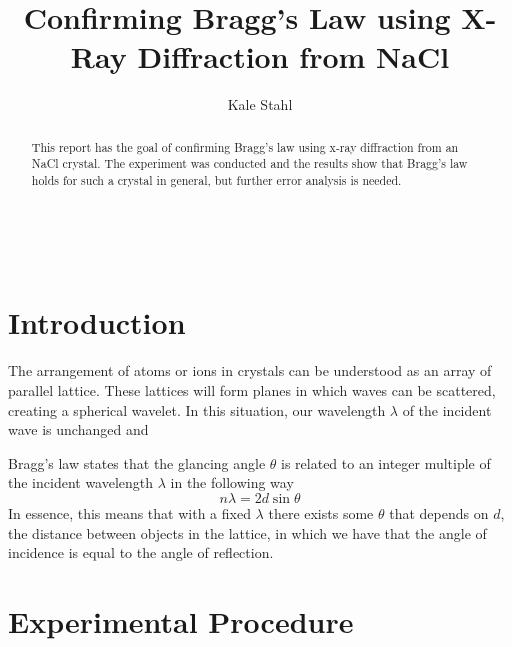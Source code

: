 \documentclass[twocolumn]{article}
\title{Confirming Bragg's Law using X-Ray Diffraction from NaCl}
\author{Kale Stahl}
\newcommand{\bd}{\textbf}
\begin{document}
	\makeatletter
	\begin{center}
		{\centering \Large \bd \@title}\\
		\vspace{.5cm}
		{\large \@author}
		\vspace{.25cm}
	\end{center}
	\makeatother
	\begin{abstract}
		This report has the goal of confirming Bragg's law using x-ray diffraction from an NaCl crystal. The experiment was conducted and the results show that Bragg's law holds for such a crystal in general, but further error analysis is needed.
	\end{abstract}
	\section{Introduction}
		The arrangement of atoms or ions in crystals can be understood as an array of parallel lattice. These lattices will form planes in which waves can be scattered, creating a spherical wavelet. In this situation, our wavelength $\lambda$ of the incident wave is unchanged and 
		
		Bragg's law states that the glancing angle $\theta$ is related to an integer multiple of the incident wavelength $\lambda$ in the following way
		\begin{equation}
			n\lambda = 2d\sin \theta \label{bragg's law}
		\end{equation}
		In essence, this means that with a fixed $\lambda$ there exists some $\theta$ that depends on $d$, the distance between objects in the lattice, in which we have that the angle of incidence is equal to the angle of reflection.
		
	\section{Experimental Procedure}
\end{document}
